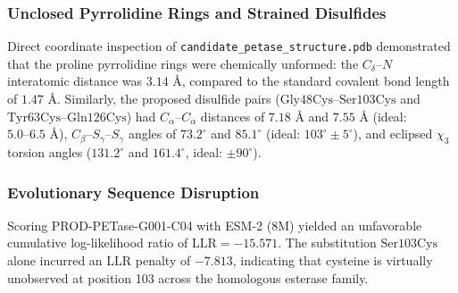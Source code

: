 \documentclass[11pt,a4paper]{article}
\begin{document}
\subsubsection{Unclosed Pyrrolidine Rings and Strained Disulfides}
Direct coordinate inspection of \texttt{candidate\_petase\_structure.pdb} demonstrated that the proline pyrrolidine rings were chemically unformed: the $C_\delta\text{--}N$ interatomic distance was $3.14\text{ \AA}$, compared to the standard covalent bond length of $1.47\text{ \AA}$. Similarly, the proposed disulfide pairs ($\text{Gly48Cys}\text{--}\text{Ser103Cys}$ and $\text{Tyr63Cys}\text{--}\text{Gln126Cys}$) had $C_\alpha\text{--}C_\alpha$ distances of $7.18\text{ \AA}$ and $7.55\text{ \AA}$ (ideal: $5.0\text{--}6.5\text{ \AA}$), $C_\beta\text{--}S_\gamma\text{--}S_\gamma$ angles of $73.2^\circ$ and $85.1^\circ$ (ideal: $103^\circ \pm 5^\circ$), and eclipsed $\chi_3$ torsion angles ($131.2^\circ$ and $161.4^\circ$, ideal: $\pm 90^\circ$).

\subsubsection{Evolutionary Sequence Disruption}
Scoring PROD-PETase-G001-C04 with ESM-2 (8M) yielded an unfavorable cumulative log-likelihood ratio of $\text{LLR} = -15.571$. The substitution $\text{Ser103Cys}$ alone incurred an $\text{LLR}$ penalty of $-7.813$, indicating that cysteine is virtually unobserved at position 103 across the homologous esterase family.
\end{document}
